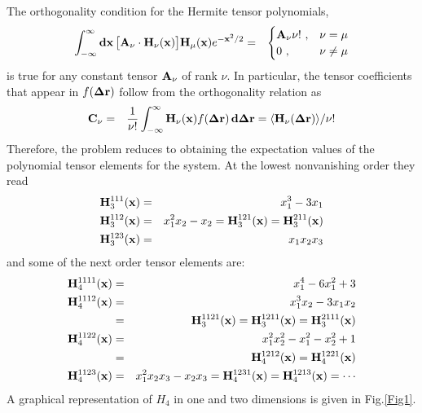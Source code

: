 \documentclass{article}
\begin{document}
The orthogonality condition for the Hermite tensor polynomials,
\begin{eqnarray}
\label{orthogonality}
\int_{-\infty}^{\infty}{\bf dx}\, \big[{\bf A}_\nu\cdot {\bf H}_\nu({\bf x})\big] {\bf
  H}_\mu({\bf x})e^{-{\bf x}^2/2} &=& \begin{cases}{\bf A}_\nu\nu !\ , & \nu=\mu
  \\ 0\ , & \nu\neq\mu \end{cases}
\end{eqnarray}
is true for any constant tensor ${\bf A}_\nu$ of rank $\nu$.  In
particular, the tensor coefficients that appear in $f({\bf \Delta r})$
follow from the orthogonality relation as
\begin{eqnarray}
\label{coefs}
{\bf C}_\nu &=& \frac{1}{\nu!}\int_{-\infty}^{\infty} {\bf H}_\nu({\bf x})
f({\bf\Delta r})\, {\bf d\Delta r} =  \langle {\bf H}_\nu({\bf\Delta r})\rangle/\nu!
\end{eqnarray}
Therefore, the problem reduces to obtaining the expectation values of
the polynomial tensor elements for the system. At the lowest
nonvanishing order they read
\begin{eqnarray}
\label{H3}
{\bf H}_3^{111}({\bf x}) &=& x_1^3 -3x_1 \nonumber \\
{\bf H}_3^{112}({\bf x}) &=& x_1^2x_2 -x_2 = {\bf H}_3^{121}({\bf x}) = {\bf
  H}_3^{211}({\bf x}) \nonumber \\
{\bf H}_3^{123}({\bf x}) &=& x_1x_2x_3
\end{eqnarray}
and some of the next order tensor elements are:
\begin{eqnarray}
\label{H4}
{\bf H}_4^{1111}({\bf x}) &=& x_1^4 -6x_1^2 + 3 \nonumber \\
{\bf H}_4^{1112}({\bf x}) &=& x_1^3x_2 - 3x_1x_2 \nonumber \\
&=& {\bf H}_3^{1121}({\bf x}) = {\bf H}_3^{1211}({\bf x}) = {\bf  H}_3^{2111}({\bf x}) \nonumber \\
{\bf H}_4^{1122}({\bf x}) &=& x_1^2x_2^2 - x_1^2 - x_2^2 + 1 \nonumber \\
&=& {\bf H}_4^{1212}({\bf x}) = {\bf  H}_4^{1221}({\bf x}) \nonumber \\
{\bf H}_4^{1123}({\bf x}) &=& x_1^2x_2x_3 - x_2x_3  = {\bf H}_4^{1231}({\bf x}) = {\bf H}_4^{1213}({\bf x}) = \cdots
\end{eqnarray}
A graphical representation of $H_4$ in one and two dimensions is given in Fig.\ref{Fig1}. 
\end{document}
